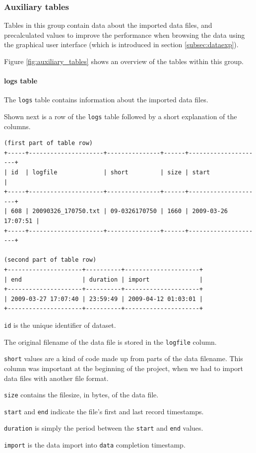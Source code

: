 \subsubsection{Auxiliary tables}
\label{subsubsec:auxiliary_tables}

Tables in this group contain data about the imported data files, and precalculated values to improve the performance when browsing the data using the graphical user interface (which is introduced in section \ref{subsec:dataexp}).

Figure \ref{fig:auxiliary_tables} shows an overview of the tables within this group. 

\paragraph{logs table}
\label{para:logs_table} 

The \lstinline|logs| table contains information about the imported data files.

Shown next is a row of the \lstinline|logs| table followed by a short explanation of the columns.

\codescript
{}
\begin{lstlisting}[frame=none]
(first part of table row)
+-----+---------------------+---------------+------+---------------------+
| id  | logfile             | short         | size | start               |
+-----+---------------------+---------------+------+---------------------+
| 608 | 20090326_170750.txt | 09-0326170750 | 1660 | 2009-03-26 17:07:51 |
+-----+---------------------+---------------+------+---------------------+

(second part of table row)
+---------------------+----------+---------------------+
| end                 | duration | import              |
+---------------------+----------+---------------------+
| 2009-03-27 17:07:40 | 23:59:49 | 2009-04-12 01:03:01 | 
+---------------------+----------+---------------------+

\end{lstlisting}

\begin{mydesc}
\item \lstinline|id| is the unique identifier of dataset.
\item The original filename of the data file is stored in the \lstinline|logfile| column.
\item \lstinline|short| values are a kind of code made up from parts of the data filename. This column was important at the beginning of the project, when we had to import data files with another file format.
\item \lstinline|size| contains the filesize, in bytes, of the data file.
\item \lstinline|start| and \lstinline|end| indicate the file's first and last record timestamps.
\item \lstinline|duration| is simply the period between the \lstinline|start| and \lstinline|end| values.
\item \lstinline|import| is the data import into \lstinline|data| completion timestamp.
\end{mydesc}

